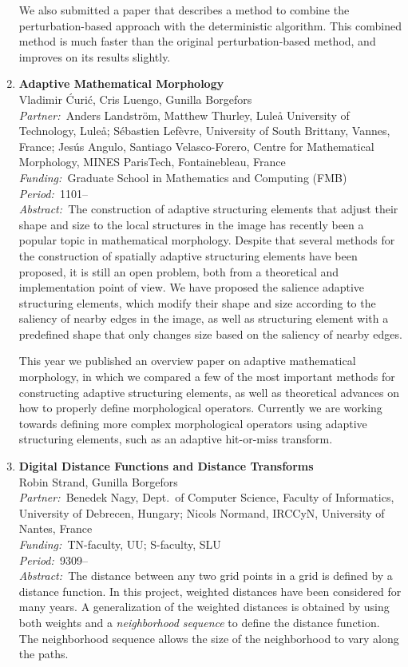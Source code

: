 \documentclass[10pt, a4paper]{article}
\newcommand{\aabstract}[1]{\emph{Abstract:~}#1}
\newcommand{\ffunding}[1]{\emph{Funding:~}#1\\}
\newcommand{\ppartner}[1]{\emph{Partner:~}#1\\}
\newcommand{\pperiod}[1]{\emph{Period:~}#1\\}
\begin{document}
\begin{enumerate}
{We also submitted a paper that describes a method to combine the perturbation-based approach with the deterministic algorithm. This combined method is much faster than the original perturbation-based method, and improves on its results slightly.}


\item 
\textbf{Adaptive Mathematical Morphology}\\
Vladimir \' Curi\' c, Cris Luengo, Gunilla Borgefors\\
\ppartner{Anders Landstr\"{o}m, Matthew Thurley, Lule\r{a} University of Technology, Lule\r{a}; S\'{e}bastien Lef\`{e}vre, University of South Brittany, Vannes, France; Jes\'{u}s Angulo, Santiago Velasco-Forero, Centre for Mathematical Morphology, MINES ParisTech, Fontainebleau, France}
\ffunding{Graduate School in Mathematics and Computing (FMB)}
\pperiod{1101--}
\aabstract{The construction of adaptive structuring elements that adjust their shape and size to the local structures in the image has recently been a popular topic in mathematical morphology. Despite that several methods for the construction of spatially adaptive structuring elements have been proposed, it is still an open problem, both from a theoretical and implementation point of view. We have proposed the salience adaptive structuring elements, which modify their shape and size according to the saliency of nearby edges in the image, as well as structuring element with a predefined shape that only changes size based on the saliency of nearby edges.

This year we published an overview paper on adaptive mathematical morphology, in which we compared a few of the most important methods for constructing adaptive structuring elements, as well as theoretical advances on how to properly define morphological operators. Currently we are working towards defining more complex morphological operators using adaptive structuring elements, such as an adaptive hit-or-miss transform.}


\item 
\label{proj:DT}
\textbf{Digital Distance Functions and Distance Transforms} \\
Robin Strand, Gunilla Borgefors \\
\ppartner{Benedek Nagy, Dept.~of Computer Science, Faculty of Informatics, University of Debrecen, Hungary; Nicols Normand, IRCCyN, University of Nantes, France}
\ffunding{TN-faculty, UU; S-faculty, SLU}
\pperiod{9309--}
\aabstract{The distance between any two grid points in a grid is defined by a distance function. In this project, weighted distances have been considered for many years. A generalization of the weighted distances is obtained by using both weights and a \textit{neighborhood sequence} to define the distance function. The neighborhood sequence allows the size of the neighborhood to vary along the paths. 

}
\end{enumerate}
\end{document}
